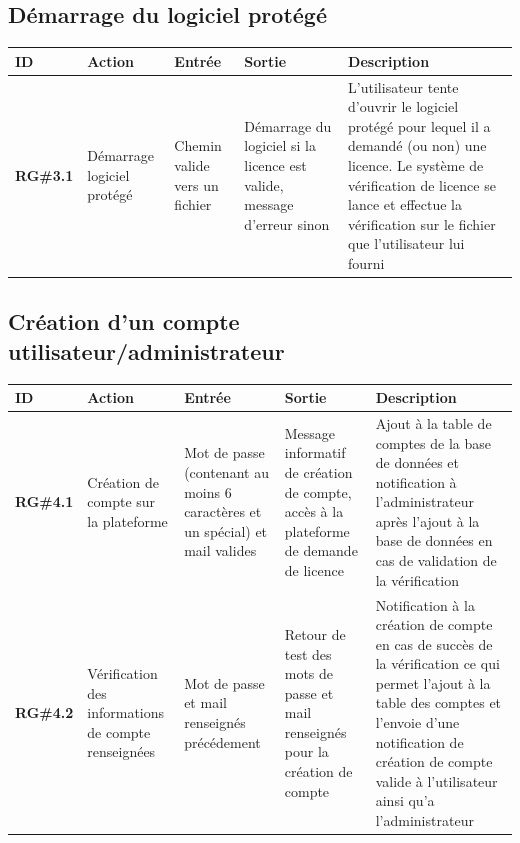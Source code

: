 \subsection{Démarrage du logiciel protégé}

\begin{table}[!h] %
    \small
    \begin{tabular}{
        |>{\raggedright\arraybackslash}m{1.5cm}
        |>{\raggedright\arraybackslash}m{1.9cm}
        |>{\raggedright\arraybackslash}m{2.5cm}
        |>{\raggedright\arraybackslash}m{2.5cm}
        |>{\raggedright\arraybackslash}m{7cm}
        |}
	\hline
	    \textbf{ID} & \textbf{Action} & \textbf{Entrée} & \textbf{Sortie} & \textbf{Description} \\
	\hline
	    \textbf{RG\#3.1} & Démarrage logiciel protégé & Chemin valide vers un fichier & Démarrage du logiciel si la licence est valide, message d'erreur sinon & L'utilisateur tente d'ouvrir le logiciel protégé pour lequel il a demandé (ou non) une licence. Le système de vérification de licence se lance et effectue la vérification sur le fichier que l'utilisateur lui fourni \\
    \hline
    \end{tabular}
\end{table}
	
\subsection{Création d'un compte utilisateur/administrateur}

\begin{table}[!h] %
    \small
    \begin{tabular}{
        |>{\raggedright\arraybackslash}m{1.5cm}
        |>{\raggedright\arraybackslash}m{1.9cm}
        |>{\raggedright\arraybackslash}m{2.5cm}
        |>{\raggedright\arraybackslash}m{2.5cm}
        |>{\raggedright\arraybackslash}m{7cm}
        |}
	\hline
	    \textbf{ID} & \textbf{Action} & \textbf{Entrée} & \textbf{Sortie} & \textbf{Description} \\
	\hline
	    \textbf{RG\#4.1} & Création de compte sur la  plateforme & Mot de passe (contenant au moins 6 caractères et un spécial) et mail valides & Message informatif de création de compte, accès à la plateforme de demande de licence& Ajout à la table de comptes de la base de données et notification à l'administrateur après l'ajout à la base de données en cas de validation de la vérification\\
	\hline
	    \textbf{RG\#4.2} & Vérification des informations de  compte renseignées & Mot de passe et mail renseignés précédement & Retour de test des mots de passe et mail renseignés pour la création de compte& Notification à la création de compte en cas de succès de la vérification ce qui permet l'ajout à la table des comptes et l'envoie d'une notification de création de compte valide à l'utilisateur ainsi qu'a l'administrateur\\
	\hline
    \end{tabular}
\end{table}

